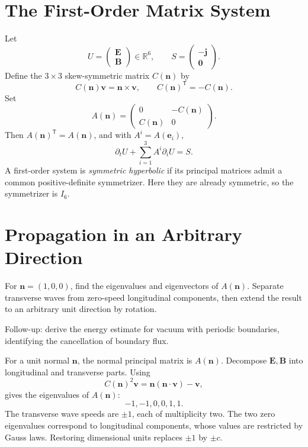 \documentclass[11pt,openany]{book}
\numberwithin{equation}{chapter}
\theoremstyle{definition}
\theoremstyle{remark}
\newcommand{\RR}{\mathbb R}
\newcommand{\mat}[1]{\begin{pmatrix}#1\end{pmatrix}}
\begin{document}
\section{The First-Order Matrix System}
Let
\begin{equation}
U=\mat{\bm E\\\bm B}\in\RR^6,
\qquad S=\mat{-\bm j\\\bm0}.
\end{equation}
Define the $3\times3$ skew-symmetric matrix $C(\bm n)$ by
\begin{equation}
C(\bm n)\bm v=\bm n\times\bm v,
\qquad C(\bm n)^\mathsf T=-C(\bm n).
\end{equation}
Set
\begin{equation}\label{eq:An}
A(\bm n)=
\begin{pmatrix}
0&-C(\bm n)\\
C(\bm n)&0
\end{pmatrix}.
\end{equation}
Then $A(\bm n)^\mathsf T=A(\bm n)$, and with $A^i=A(\bm e_i)$,
\begin{equation}\label{eq:matrixhyper}
\boxed{\partial_tU+\sum_{i=1}^3A^i\partial_iU=S.}
\end{equation}
A first-order system is \emph{symmetric hyperbolic} if its principal matrices admit a common positive-definite symmetrizer. Here they are already symmetric, so the symmetrizer is $I_6$.

\section{Propagation in an Arbitrary Direction}
\begin{askai}
For $\bm n=(1,0,0)$, find the eigenvalues and eigenvectors of $A(\bm n)$. Separate transverse waves from zero-speed longitudinal components, then extend the result to an arbitrary unit direction by rotation.

Follow-up: derive the energy estimate for vacuum with periodic boundaries, identifying the cancellation of boundary flux.
\end{askai}
For a unit normal $\bm n$, the normal principal matrix is $A(\bm n)$. Decompose $\bm E,\bm B$ into longitudinal and transverse parts. Using
\begin{equation}
C(\bm n)^2\bm v=\bm n(\bm n\cdot\bm v)-\bm v,
\end{equation}
gives the eigenvalues of $A(\bm n)$:
\begin{equation}\label{eq:eigenvalues}
\boxed{-1,-1,0,0,1,1.}
\end{equation}
The transverse wave speeds are $\pm1$, each of multiplicity two. The two zero eigenvalues correspond to longitudinal components, whose values are restricted by Gauss laws. Restoring dimensional units replaces $\pm1$ by $\pm c$.
\end{document}
